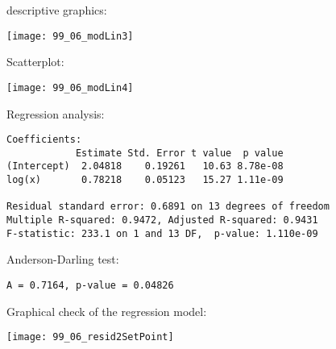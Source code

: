 \begin{frame}
  descriptive graphics:\\
  \vspace{-0.3cm}
  \begin{center}
    \texttt{[image: 99\_06\_modLin3]}
  \end{center}
\end{frame}

\begin{frame}
  \vspace{0.5cm}
  Scatterplot:\\
  \vspace{-0.8cm}
  \begin{center}
    \texttt{[image: 99\_06\_modLin4]}
  \end{center}
\end{frame}

\begin{frame}[fragile]
  Regression analysis:\\
  \begin{small}
    \begin{verbatim}
Coefficients:
            Estimate Std. Error t value  p value    
(Intercept)  2.04818    0.19261   10.63 8.78e-08
log(x)       0.78218    0.05123   15.27 1.11e-09

Residual standard error: 0.6891 on 13 degrees of freedom
Multiple R-squared: 0.9472,	Adjusted R-squared: 0.9431 
F-statistic: 233.1 on 1 and 13 DF,  p-value: 1.110e-09  
    \end{verbatim}
  \end{small}
  Anderson-Darling test:\\
  \begin{small}
    \begin{verbatim}
A = 0.7164, p-value = 0.04826
    \end{verbatim}
  \end{small}
\end{frame}

\begin{frame}
  Graphical check of the regression model:\\
  \vspace{.1cm}
  \begin{center}
    \texttt{[image: 99\_06\_resid2SetPoint]}
    \end{center}
\end{frame}

